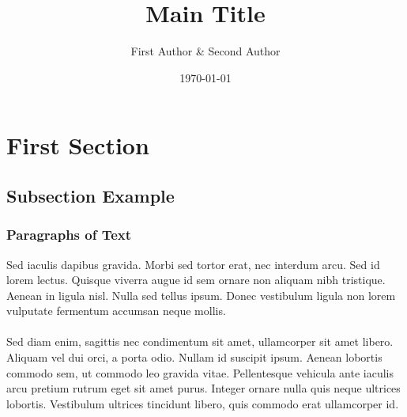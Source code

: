 \documentclass[aspectratio=169,xcolor=dvipsnames]{beamer}
\title[short title]{\huge Main Title}
\author{First Author \& Second Author}
\institute{Electrical \& Computer Engineering Department}
\date{\today}
\begin{document}
\begin{frame}[plain]
    \titlepage
\end{frame}

\section{First Section} %

\subsection{Subsection Example} %


\begin{frame}
    \frametitle{Paragraphs of Text}
    Sed iaculis dapibus gravida. Morbi sed tortor erat, nec interdum arcu. Sed id lorem lectus. Quisque viverra augue id sem ornare non aliquam nibh tristique. Aenean in ligula nisl. Nulla sed tellus ipsum. Donec vestibulum ligula non lorem vulputate fermentum accumsan neque mollis.\\~\\

    Sed diam enim, sagittis nec condimentum sit amet, ullamcorper sit amet libero. Aliquam vel dui orci, a porta odio. Nullam id suscipit ipsum. Aenean lobortis commodo sem, ut commodo leo gravida vitae. Pellentesque vehicula ante iaculis arcu pretium rutrum eget sit amet purus. Integer ornare nulla quis neque ultrices lobortis. Vestibulum ultrices tincidunt libero, quis commodo erat ullamcorper id.
\end{frame}
\end{document}
